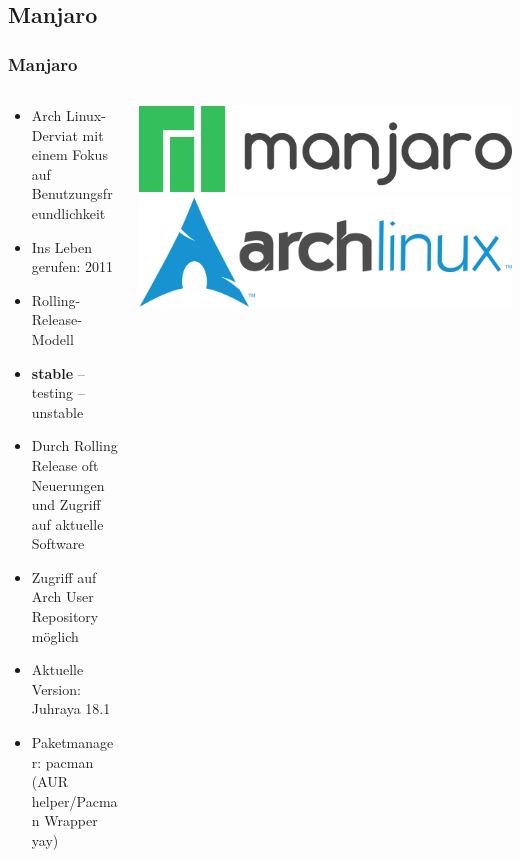 \documentclass[9pt]{beamer}
\begin{document}
\subsection{Manjaro}
\begin{frame}
 \frametitle{Manjaro}
 \begin{columns} 
    \begin{column}[c]{0.6\textwidth}

	\begin{itemize}
		\item Arch Linux-Derviat mit einem Fokus auf Benutzungsfreundlichkeit
		\item Ins Leben gerufen: 2011
		\item Rolling-Release-Modell
		\item \textbf{stable} -- testing -- unstable
		\item Durch Rolling Release oft Neuerungen und Zugriff auf aktuelle Software
		\item Zugriff auf Arch User Repository möglich
		\item Aktuelle Version: Juhraya 18.1
		\item Paketmanager: pacman (AUR helper/Pacman Wrapper yay)
	\end{itemize}
	\end{column}
	
	\begin{column}{0.4\textwidth}
    \includegraphics[width=1.0\textwidth]{assets/manjaro.png}
    \includegraphics[width=1.0\textwidth]{assets/arch.png} 
	\end{column}

 \end{columns}
\end{frame}
\end{document}
